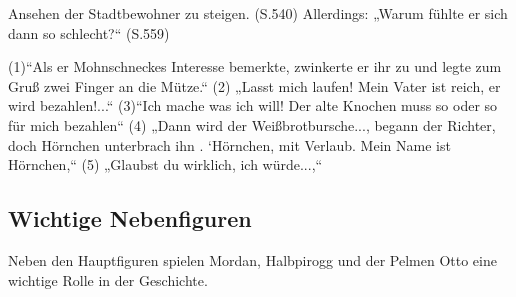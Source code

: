 Ansehen der Stadtbewohner zu steigen. (S.540) Allerdings: „Warum fühlte er sich dann so schlecht?“ (S.559)


(1)“Als er Mohnschneckes Interesse bemerkte, zwinkerte er ihr zu und legte zum Gruß zwei Finger an die Mütze.“
(2) „Lasst mich laufen! Mein Vater ist reich, er wird bezahlen!...“
(3)“Ich mache was ich will! Der alte Knochen muss so oder so für mich bezahlen“
(4) „Dann wird der Weißbrotbursche..., begann der Richter, doch Hörnchen unterbrach ihn . `Hörnchen, mit Verlaub. Mein Name ist Hörnchen,“
(5) „Glaubst du wirklich, ich würde...,“

\subsection{Wichtige Nebenfiguren}
Neben den Hauptfiguren spielen Mordan, Halbpirogg und der Pelmen Otto eine wichtige Rolle in der Geschichte.

